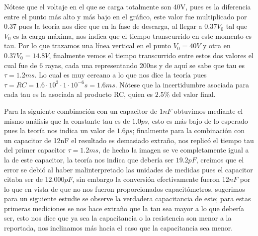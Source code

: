 \documentclass[article,12pt]{elsarticle}
\begin{document}
Nótese que el voltaje en el que se carga totalmente son 40V, pues es la diferencia entre el punto más alto y más bajo en el gráfico, este valor fue multiplicado por 0.37 pues la teoría nos dice que en la fase de descarga, al llegar a $0.37V_0$ tal que $V_0$ es la carga máxima, nos indica que el tiempo transcurrido en este momento es tau. Por lo que trazamos una línea vertical en el punto $V_0=40V$ y otra en $0.37V_0=14.8V$, finalmente vemos el tiempo transcurrido entre estos dos valores el cual fue de 6 rayas, cada una representando 200ns y de aquí se sabe que tau es $\tau = 1.2ms$. Lo cual es muy cercano a lo que nos dice la teoría pues $\tau = RC = 1.6 \cdot 10^3 \cdot 1 \cdot 10^{-6} s = 1.6 ms$. Nótese que la incertidumbre asociada para cada tau es la asociada al producto RC, quien es $2.5\%$ del valor final.

Para la siguiente combinación con un capacitor de $1nF$ obtuvimos mediante el mismo análisis que la constante tau es de $1.0ps$, esto es más bajo de lo esperado pues la teoría nos indica un valor de $1.6ps$; finalmente para la combinación con un capacitor de 12nF el resultado es demasiado extraño, nos replicó el tiempo tau del primer capacitor $\tau = 1.2ms$, de hecho la imagen se ve completamente igual a la de este capacitor, la teoría nos indica que debería ser $19.2pF$, creímos que el error se debió al haber malinterpretado las unidades de medidas pues el capacitor citaba ser de $12.000pF$, sin embargo la conversión efectivamente fueron $12nF$ por lo que en vista de que no nos fueron proporcionados capacitómetros, sugerimos para un siguiente estudie se observe la verdadera capacitancia de este; para estas primeras mediciones se nos hace extraño que la tau sea mayor a lo que debería ser, esto nos dice que ya sea la capacitancia o la resistencia son menor a la reportada, nos inclinamos más hacia el caso que la capacitancia sea menor.
\end{document}
